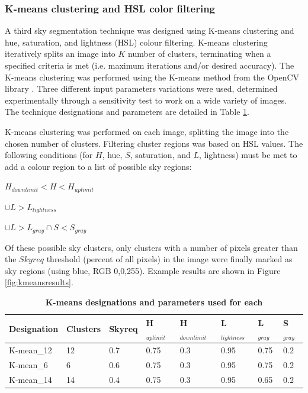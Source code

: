 \documentclass[final,3p,times,authoryear]{elsarticle}
\begin{document}
\subsubsection{K-means clustering and HSL color filtering}\label{sec:kmeans}
A third sky segmentation technique was designed using K-means clustering and hue, saturation, and lightness (HSL) colour filtering. K-means clustering iteratively splits an image into $K$ number of clusters, terminating when a specified criteria is met (i.e. maximum iterations and/or desired accuracy). The K-means clustering was performed using the K-means method from the OpenCV library \citep{Bradski2000}. Three different input parameters variations were used, determined experimentally through a sensitivity test to work on a wide variety of images. The technique designations and parameters are detailed in Table \ref{tab:techniques3}. 

K-means clustering was performed on each image, splitting the image into the chosen number of clusters. Filtering cluster regions was based on HSL values. The following conditions (for $H$, hue, $S$, saturation, and $L$, lightness) must be met to add a colour region to a list of possible sky regions: 

$H_{downlimit} < H < H_{uplimit}$

$\cup L > L_{lightness}$

$\cup L > L_{gray} \cap S < S_{gray}$

Of these possible sky clusters, only clusters with a number of pixels greater than the $Skyreq$ threshold (percent of all pixels) in the image were finally marked as sky regions (using blue, RGB 0,0,255). Example results are shown in Figure \ref{fig:kmeansresults}. 

\begin{table}[!htbp]
\caption{\bf K-means designations and parameters used for each \label{tab:techniques3}}     
\begin{tabular}{ l l l l l l l l}
\textbf{Designation} & \textbf{Clusters} & \textbf{Skyreq}&\textbf{H$_{uplimit}$}&\textbf{H$_{downlimit}$} & \textbf{L$_{lightness}$} & \textbf{L$_{gray}$}& \textbf{S$_{gray}$} \\ \hline
K-mean\_12  & 12 & 0.7& 0.75& 0.3 & 0.95 & 0.75 & 0.2 \\
K-mean\_6  & 6 & 0.6& 0.75& 0.3 & 0.95 & 0.75 & 0.2 \\
K-mean\_14  & 14 & 0.4& 0.75& 0.3 & 0.95 & 0.65 & 0.2 \\
\hline
\end{tabular}
\end{table}
\end{document}
